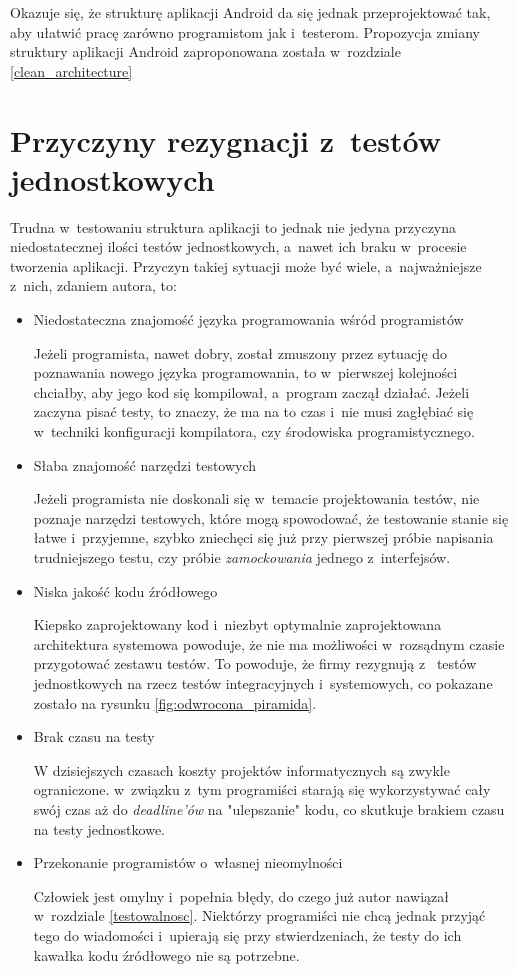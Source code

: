 Okazuje się, że strukturę aplikacji Android da się jednak przeprojektować tak, aby ułatwić pracę zarówno programistom jak i~testerom. Propozycja zmiany struktury aplikacji Android zaproponowana została w~rozdziale \ref{clean_architecture}

\section{Przyczyny rezygnacji z~testów jednostkowych}
\label{testy_jednostkowe_brak}
Trudna w~testowaniu struktura aplikacji to jednak nie jedyna przyczyna niedostatecznej ilości testów jednostkowych, a~nawet ich braku w~procesie tworzenia aplikacji. Przyczyn takiej sytuacji może być wiele, a~najważniejsze z~nich, zdaniem autora, to:
\begin{itemize}
\item
Niedostateczna znajomość języka programowania wśród programistów

Jeżeli programista, nawet dobry, został zmuszony przez sytuację do poznawania nowego języka programowania, to w~pierwszej kolejności chciałby, aby jego kod się kompilował, a~program zaczął działać. Jeżeli zaczyna pisać testy, to znaczy, że ma na to czas i~nie musi zagłębiać się w~techniki konfiguracji kompilatora, czy środowiska programistycznego. 

\item
Słaba znajomość narzędzi testowych

Jeżeli programista nie doskonali się w~temacie projektowania testów, nie poznaje narzędzi testowych, które mogą spowodować, że testowanie stanie się łatwe i~przyjemne, szybko zniechęci się już przy pierwszej próbie napisania trudniejszego testu, czy próbie \textit{zamockowania} jednego z~interfejsów.

\item
Niska jakość kodu źródłowego

Kiepsko zaprojektowany kod i~niezbyt optymalnie zaprojektowana architektura systemowa powoduje, że nie ma możliwości w~rozsądnym czasie przygotować zestawu testów. To powoduje, że firmy rezygnują z~ testów jednostkowych na rzecz testów integracyjnych i~systemowych, co pokazane zostało na rysunku \ref{fig:odwrocona_piramida}.

\item
Brak czasu na testy

W dzisiejszych czasach koszty projektów informatycznych są zwykle ograniczone. w~związku z~tym programiści starają się wykorzystywać cały swój czas aż do \textit{deadline'ów} na "ulepszanie" kodu, co skutkuje brakiem czasu na testy jednostkowe.

\item
Przekonanie programistów o~własnej nieomylności

Człowiek jest omylny i~popełnia błędy, do czego już autor nawiązał w~rozdziale \ref{testowalnosc}. Niektórzy programiści nie chcą jednak przyjąć tego do wiadomości i~upierają się przy stwierdzeniach, że testy do ich kawałka kodu źródłowego nie są potrzebne.
\end{itemize}

